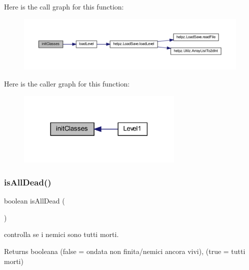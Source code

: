 Here is the call graph for this function\+:
\nopagebreak
\begin{figure}[H]
\begin{center}
\leavevmode
\includegraphics[width=350pt]{classscenes_1_1_level1_afe125d345675ffefe8da7e96d39773f3_cgraph}
\end{center}
\end{figure}
Here is the caller graph for this function\+:\nopagebreak
\begin{figure}[H]
\begin{center}
\leavevmode
\includegraphics[width=225pt]{classscenes_1_1_level1_afe125d345675ffefe8da7e96d39773f3_icgraph}
\end{center}
\end{figure}
\mbox{\label{classscenes_1_1_level1_acd1846d50c3d8678777f9ab6716f5cf3}} 
\subsubsection{\texorpdfstring{is\+All\+Dead()}{isAllDead()}}
{\footnotesize\ttfamily boolean is\+All\+Dead (\begin{DoxyParamCaption}{ }\end{DoxyParamCaption})\hspace{0.3cm}{\ttfamily [private]}}



controlla se i nemici sono tutti morti. 

\begin{DoxyReturn}{Returns}
booleana (false = ondata non finita/nemici ancora vivi), (true = tutti morti) 
\end{DoxyReturn}


